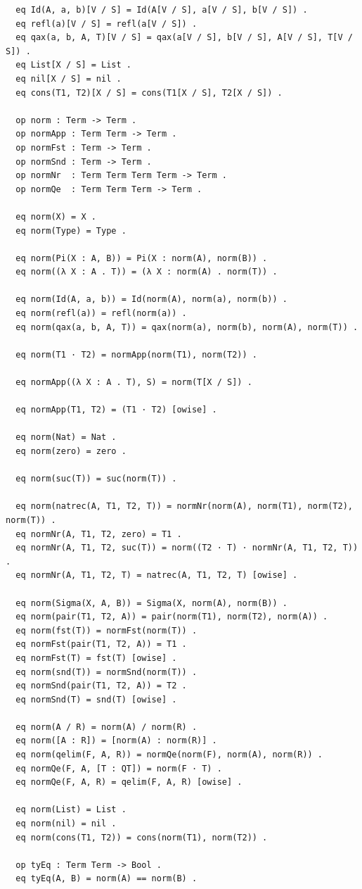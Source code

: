 \begin{lstlisting}
  eq Id(A, a, b)[V / S] = Id(A[V / S], a[V / S], b[V / S]) .
  eq refl(a)[V / S] = refl(a[V / S]) .
  eq qax(a, b, A, T)[V / S] = qax(a[V / S], b[V / S], A[V / S], T[V / S]) .
  eq List[X / S] = List .
  eq nil[X / S] = nil .
  eq cons(T1, T2)[X / S] = cons(T1[X / S], T2[X / S]) .

  op norm : Term -> Term .
  op normApp : Term Term -> Term .
  op normFst : Term -> Term .
  op normSnd : Term -> Term .
  op normNr  : Term Term Term Term -> Term .
  op normQe  : Term Term Term -> Term .

  eq norm(X) = X .
  eq norm(Type) = Type .

  eq norm(Pi(X : A, B)) = Pi(X : norm(A), norm(B)) .
  eq norm((λ X : A . T)) = (λ X : norm(A) . norm(T)) .

  eq norm(Id(A, a, b)) = Id(norm(A), norm(a), norm(b)) .
  eq norm(refl(a)) = refl(norm(a)) .
  eq norm(qax(a, b, A, T)) = qax(norm(a), norm(b), norm(A), norm(T)) .

  eq norm(T1 · T2) = normApp(norm(T1), norm(T2)) .

  eq normApp((λ X : A . T), S) = norm(T[X / S]) .

  eq normApp(T1, T2) = (T1 · T2) [owise] .

  eq norm(Nat) = Nat .
  eq norm(zero) = zero .

  eq norm(suc(T)) = suc(norm(T)) .

  eq norm(natrec(A, T1, T2, T)) = normNr(norm(A), norm(T1), norm(T2), norm(T)) .
  eq normNr(A, T1, T2, zero) = T1 .
  eq normNr(A, T1, T2, suc(T)) = norm((T2 · T) · normNr(A, T1, T2, T)) .
  eq normNr(A, T1, T2, T) = natrec(A, T1, T2, T) [owise] .

  eq norm(Sigma(X, A, B)) = Sigma(X, norm(A), norm(B)) .
  eq norm(pair(T1, T2, A)) = pair(norm(T1), norm(T2), norm(A)) .
  eq norm(fst(T)) = normFst(norm(T)) .
  eq normFst(pair(T1, T2, A)) = T1 .
  eq normFst(T) = fst(T) [owise] .
  eq norm(snd(T)) = normSnd(norm(T)) .
  eq normSnd(pair(T1, T2, A)) = T2 .
  eq normSnd(T) = snd(T) [owise] .

  eq norm(A / R) = norm(A) / norm(R) .
  eq norm([A : R]) = [norm(A) : norm(R)] .
  eq norm(qelim(F, A, R)) = normQe(norm(F), norm(A), norm(R)) .
  eq normQe(F, A, [T : QT]) = norm(F · T) .
  eq normQe(F, A, R) = qelim(F, A, R) [owise] .

  eq norm(List) = List .
  eq norm(nil) = nil .
  eq norm(cons(T1, T2)) = cons(norm(T1), norm(T2)) .

  op tyEq : Term Term -> Bool .
  eq tyEq(A, B) = norm(A) == norm(B) .


\end{lstlisting}
